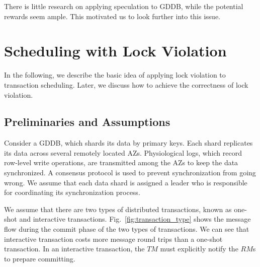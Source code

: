 \documentclass[conference]{IEEEtran}
\begin{document}
There is little research on applying speculation to GDDB, while the potential rewards seem ample. This motivated us to look further into this issue. 


\section{Scheduling with Lock Violation}
\label{sec:non_strict}

In the following, we describe the basic idea of applying lock violation to transaction scheduling.
Later, we discuss how to achieve the correctness of lock violation.

\subsection{Preliminaries and Assumptions}
Consider a GDDB, which shards its data by primary keys.
Each shard replicates its data across several remotely located AZs.
Physiological logs, which record row-level write operations, are transmitted among the AZs to keep the data synchronized.
A consensus protocol is used to prevent synchronization from going wrong.
We assume that each data shard is assigned a leader who is responsible for coordinating its synchronization process.

We assume that there are two types of distributed transactions, known as one-shot and interactive transactions.
Fig.~\ref{fig:transaction_type} shows the message flow during the commit phase of the two types of transactions.
We can see that interactive transaction costs more message round trips than a one-shot transaction.
In an interactive transaction, the $TM$ must explicitly notify the $RM$s to prepare committing.
\end{document}
